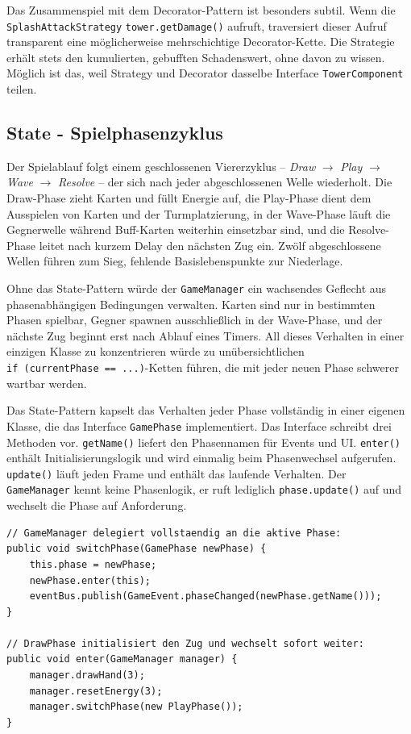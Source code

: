 Das Zusammenspiel mit dem Decorator-Pattern ist besonders subtil. Wenn die
\texttt{Splash\-Attack\-Strategy} \texttt{tower.getDamage()} aufruft, traversiert
dieser Aufruf transparent eine möglicherweise mehrschichtige Decorator-Kette.
Die Strategie erhält stets den kumulierten, gebufften Schadenswert, ohne davon
zu wissen. Möglich ist das, weil Strategy und Decorator dasselbe Interface
\texttt{TowerComponent} teilen.

\subsection{State - Spielphasenzyklus}

Der Spielablauf folgt einem geschlossenen Viererzyklus -- \textit{Draw}
$\rightarrow$ \textit{Play} $\rightarrow$ \textit{Wave} $\rightarrow$
\textit{Resolve} -- der sich nach jeder abgeschlossenen Welle wiederholt.
Die Draw-Phase zieht Karten und füllt Energie auf, die Play-Phase dient dem
Ausspielen von Karten und der Turmplatzierung, in der Wave-Phase läuft die
Gegnerwelle während Buff-Karten weiterhin einsetzbar sind, und die
Resolve-Phase leitet nach kurzem Delay den nächsten Zug ein. Zwölf abgeschlossene Wellen führen zum Sieg, fehlende
Basislebenspunkte zur Niederlage.

Ohne das State-Pattern würde der \texttt{GameManager} ein wachsendes Geflecht
aus phasen\-abhängigen Bedingungen verwalten. Karten sind nur in bestimmten
Phasen spielbar, Gegner spawnen ausschließlich in der Wave-Phase, und der
nächste Zug beginnt erst nach Ablauf eines Timers. All dieses Verhalten in einer einzigen
Klasse zu konzentrieren würde zu unübersichtlichen
\texttt{if~(currentPhase~==~...)}-Ketten führen, die mit jeder neuen Phase
schwerer wartbar werden.

Das State-Pattern kapselt das Verhalten jeder Phase vollständig in einer eigenen
Klasse, die das Interface \texttt{GamePhase} implementiert. Das Interface
schreibt drei Methoden vor. \texttt{getName()} liefert den Phasennamen für
Events und UI. \texttt{enter()} enthält Initialisierungslogik und wird einmalig
beim Phasenwechsel aufgerufen. \texttt{update()} läuft jeden Frame und enthält
das laufende Verhalten. Der \texttt{GameManager} kennt keine Phasenlogik, er ruft lediglich
\texttt{phase.update()} auf und wechselt die Phase auf Anforderung.

\begin{lstlisting}[caption={Phasenwechsel im GameManager und Beispielphase},label=lst:state]
// GameManager delegiert vollstaendig an die aktive Phase:
public void switchPhase(GamePhase newPhase) {
    this.phase = newPhase;
    newPhase.enter(this);
    eventBus.publish(GameEvent.phaseChanged(newPhase.getName()));
}

// DrawPhase initialisiert den Zug und wechselt sofort weiter:
public void enter(GameManager manager) {
    manager.drawHand(3);
    manager.resetEnergy(3);
    manager.switchPhase(new PlayPhase());
}
\end{lstlisting}

